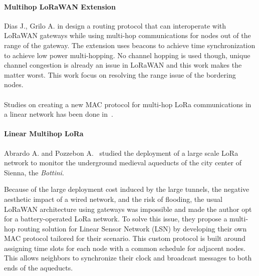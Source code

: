\paragraph{Multihop LoRaWAN Extension} Dias J., Grilo A. in \cite{DIAS2018424}
design a routing protocol that can interoperate with LoRaWAN gateways while
using multi-hop communications for nodes out of the range of the gateway.
The extension uses beacons to achieve time synchronization to achieve low power
multi-hopping.
No channel hopping is used though, unique channel congestion is already an issue
in LoRaWAN and this work makes the matter worst.
This work focus on resolving the range issue of the bordering nodes.


\paragraph{}

Studies on creating a new MAC protocol for multi-hop LoRa communications in a linear
network has been done in~\cite{Abrardo_2019,duong2018}.

\paragraph{Linear Multihop LoRa}

Abrardo A. and Pozzebon A.~\cite{Abrardo_2019} studied the deployment of a
large scale LoRa network to monitor the underground medieval aqueducts of the city center
of Sienna, the \emph{Bottini}.

Because of the large deployment cost induced by the large tunnels, the negative
aesthetic impact of a wired network, and the risk of flooding,
the usual LoRaWAN architecture using gateways was impossible and made the author
opt for a battery-operated LoRa network.
To solve this issue, they propose a multi-hop routing solution for Linear Sensor
Network (LSN) by developing their own MAC protocol tailored for their scenario.
This custom protocol is built around assigning time slots for each node with
a common schedule for adjacent nodes.
This allows neighbors to synchronize their clock and broadcast messages to
both ends of the aqueducts.

